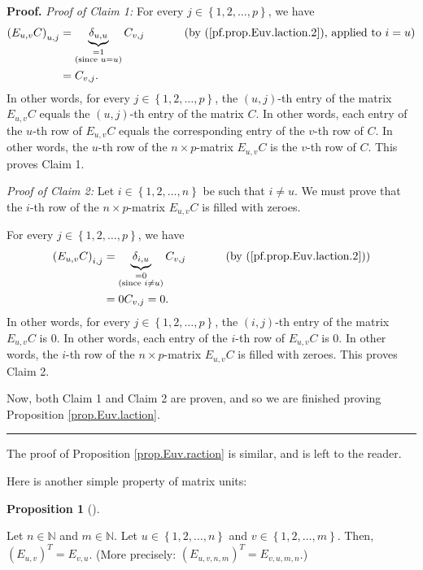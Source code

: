 \documentclass[numbers=enddot,12pt,final,onecolumn,notitlepage]{scrartcl}%
\theoremstyle{definition}
\newtheorem{prop}[theo]{Proposition}
\newenvironment{proposition}[1][]
{\begin{prop}[#1]\begin{leftbar}}
{\end{leftbar}\end{prop}}
\newenvironment{proof}[1][Proof]{\noindent\textbf{#1.} }{\ \rule{0.5em}{0.5em}}
\begin{document}
\begin{proof}
\textit{Proof of Claim 1:} For every $j\in\left\{  1,2,\ldots,p\right\}  $, we
have%
\begin{align*}
\left(  E_{u,v}C\right)  _{u,j}  &  =\underbrace{\delta_{u,u}}%
_{\substack{=1\\\text{(since }u=u\text{)}}}C_{v,j}\ \ \ \ \ \ \ \ \ \ \left(
\text{by (\ref{pf.prop.Euv.laction.2}), applied to }i=u\right) \\
&  =C_{v,j}.
\end{align*}
In other words, for every $j\in\left\{  1,2,\ldots,p\right\}  $, the $\left(
u,j\right)  $-th entry of the matrix $E_{u,v}C$ equals the $\left(
u,j\right)  $-th entry of the matrix $C$. In other words, each entry of the
$u$-th row of $E_{u,v}C$ equals the corresponding entry of the $v$-th row of
$C$. In other words, the $u$-th row of the $n\times p$-matrix $E_{u,v}C$ is
the $v$-th row of $C$. This proves Claim 1.

\textit{Proof of Claim 2:} Let $i\in\left\{  1,2,\ldots,n\right\}  $ be such
that $i\neq u$. We must prove that the $i$-th row of the $n\times p$-matrix
$E_{u,v}C$ is filled with zeroes.

For every $j\in\left\{  1,2,\ldots,p\right\}  $, we have%
\begin{align*}
\left(  E_{u,v}C\right)  _{i,j}  &  =\underbrace{\delta_{i,u}}%
_{\substack{=0\\\text{(since }i\neq u\text{)}}}C_{v,j}%
\ \ \ \ \ \ \ \ \ \ \left(  \text{by (\ref{pf.prop.Euv.laction.2})}\right) \\
&  =0C_{v,j}=0.
\end{align*}
In other words, for every $j\in\left\{  1,2,\ldots,p\right\}  $, the $\left(
i,j\right)  $-th entry of the matrix $E_{u,v}C$ is $0$. In other words, each
entry of the $i$-th row of $E_{u,v}C$ is $0$. In other words, the $i$-th row
of the $n\times p$-matrix $E_{u,v}C$ is filled with zeroes. This proves Claim 2.

Now, both Claim 1 and Claim 2 are proven, and so we are finished proving
Proposition \ref{prop.Euv.laction}.
\end{proof}

The proof of Proposition \ref{prop.Euv.raction} is similar, and is left to the reader.

Here is another simple property of matrix units:

\begin{proposition}
\label{prop.Euv.transpose}Let $n\in\mathbb{N}$ and $m\in\mathbb{N}$. Let
$u\in\left\{  1,2,\ldots,n\right\}  $ and $v\in\left\{  1,2,\ldots,m\right\}
$. Then, $\left(  E_{u,v}\right)  ^{T}=E_{v,u}$. (More precisely: $\left(
E_{u,v,n,m}\right)  ^{T}=E_{v,u,m,n}$.)
\end{proposition}
\end{document}
